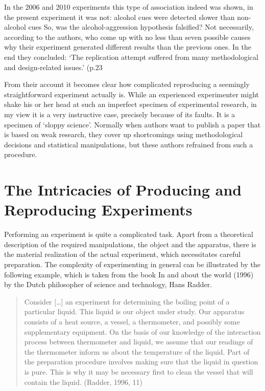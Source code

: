 \documentclass[twocolumn, serif, review, authordate]{jote-article}
\begin{document}
In the 2006 and 2010 experiments this type of association indeed was shown, in the present experiment it was not: alcohol cues were detected slower than non-alcohol cues So, was the alcohol-aggression hypothesis falsified? Not necessarily, according to the authors, who come up with no less than seven possible causes why their experiment generated different results than the previous ones. In the end they concluded: `The replication attempt suffered from many methodological and design-related issues.' (p.23
 
From their account it becomes clear how complicated reproducing a seemingly straightforward experiment actually is. While an experienced experimenter might shake his or her head at such an imperfect specimen of experimental research, in my view it is a very instructive case, precisely because of its faults. It is a specimen of `sloppy science'. Normally when authors want to publish a paper that is based on weak research, they cover up shortcomings using methodological decisions and statistical manipulations, but these authors refrained from such a procedure.

{}
\section*{The Intricacies of Producing and Reproducing Experiments}
\gotoreview
\label{sec:intricacies}
\noindent Performing an experiment is quite a complicated task. Apart from a theoretical description of the required manipulations, the object and the apparatus, there is the material realization of the actual experiment, which necessitates careful preparation. The complexity of experimenting in general can be illustrated by the following example, which is taken from the book In and about the world (1996) by the Dutch philosopher of science and technology, Hans Radder.


\blockquote{Consider [{\dots}] an experiment for determining the boiling point of a particular liquid. This liquid is our object under study. Our apparatus consists of a heat source, a vessel, a thermometer, and possibly some supplementary equipment. On the basis of our knowledge of the interaction process between thermometer and liquid, we assume that our readings of the thermometer inform us about the temperature of the liquid. Part of the preparation procedure involves making sure that the liquid in question is pure. This is why it may be necessary first to clean the vessel that will contain the liquid. (Radder, 1996, 11)} 
\end{document}
